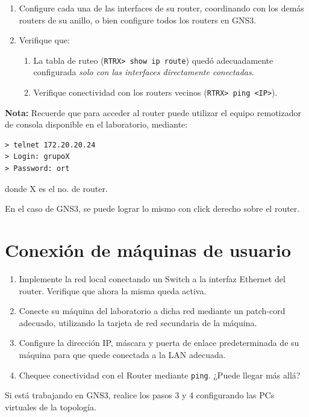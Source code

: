 \documentclass[a4paper,10pt]{article}
\begin{document}
\begin{enumerate}
    \item Configure cada una de las interfaces de su router, coordinando con los demás routers de su anillo, o bien configure todos los routers en GNS3.
    \item Verifique que:
    \begin{enumerate}
        \item La tabla de ruteo (\texttt{RTRX> show ip route}) quedó adecuadamente configurada \emph{solo con las interfaces directamente conectadas}.
        \item Verifique conectividad con los routers vecinos (\texttt{RTRX> ping <IP>}).
    \end{enumerate}

\end{enumerate}

\textbf{Nota:} Recuerde que para acceder al router puede utilizar el equipo remotizador de consola disponible en el laboratorio, mediante:
\begin{verbatim}
> telnet 172.20.20.24
> Login: grupoX
> Password: ort
\end{verbatim}
donde X es el no. de router.

En el caso de GNS3, se puede lograr lo mismo con click derecho sobre el router.

\section{Conexión de máquinas de usuario}

\begin{enumerate}
    \item Implemente la red local conectando un Switch a la interfaz Ethernet del router. Verifique que ahora la misma queda activa.
    \item Conecte su máquina del laboratorio a dicha red mediante un patch-cord adecuado, utilizando la tarjeta de red secundaria de la máquina.
    \item Configure la dirección IP, máscara y puerta de enlace predeterminada de su máquina para que quede conectada a la LAN adecuada.
    \item Chequee conectividad con el Router mediante \texttt{ping}. ¿Puede llegar más allá?
\end{enumerate}

Si está trabajando en GNS3, realice los pasos 3 y 4 configurando las PCs virtuales de la topología.
\end{document}
